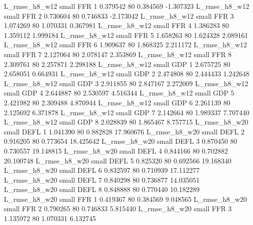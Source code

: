  L_rmse_h8_w12      small      FFR                 1 0.379542 80       0.384569          -1.307323
 L_rmse_h8_w12      small      FFR                 2 0.730604 80       0.746833          -2.173042
 L_rmse_h8_w12      small      FFR                 3 1.074269 80       1.070331           0.367981
 L_rmse_h8_w12      small      FFR                 4 1.386283 80       1.359112           1.999184
 L_rmse_h8_w12      small      FFR                 5 1.658263 80       1.624328           2.089161
 L_rmse_h8_w12      small      FFR                 6 1.909637 80       1.868325           2.211172
 L_rmse_h8_w12      small      FFR                 7 2.127064 80       2.078147           2.353869
 L_rmse_h8_w12      small      FFR                 8 2.309761 80       2.257871           2.298188
 L_rmse_h8_w12      small      GDP                 1 2.675725 80       2.658051           0.664931
 L_rmse_h8_w12      small      GDP                 2 2.474808 80       2.444433           1.242648
 L_rmse_h8_w12      small      GDP                 3 2.911855 80       2.847167           2.272009
 L_rmse_h8_w12      small      GDP                 4 2.644887 80       2.530597           4.516344
 L_rmse_h8_w12      small      GDP                 5 2.421982 80       2.309488           4.870944
 L_rmse_h8_w12      small      GDP                 6 2.261139 80       2.125692           6.371878
 L_rmse_h8_w12      small      GDP                 7 2.142664 80       1.989337           7.707440
 L_rmse_h8_w12      small      GDP                 8 2.028839 80       1.865467           8.757715
 L_rmse_h8_w20      small     DEFL                 1 1.041390 80       0.882828          17.960676
 L_rmse_h8_w20      small     DEFL                 2 0.916205 80       0.773654          18.425642
 L_rmse_h8_w20      small     DEFL                 3 0.870450 80       0.730557          19.148815
 L_rmse_h8_w20      small     DEFL                 4 0.844166 80       0.702882          20.100748
 L_rmse_h8_w20      small     DEFL                 5 0.825320 80       0.692566          19.168340
 L_rmse_h8_w20      small     DEFL                 6 0.832597 80       0.710939          17.112277
 L_rmse_h8_w20      small     DEFL                 7 0.840298 80       0.736877          14.035051
 L_rmse_h8_w20      small     DEFL                 8 0.848888 80       0.770440          10.182289
 L_rmse_h8_w20      small      FFR                 1 0.419367 80       0.384569           9.048565
 L_rmse_h8_w20      small      FFR                 2 0.790265 80       0.746833           5.815440
 L_rmse_h8_w20      small      FFR                 3 1.135972 80       1.070331           6.132745
